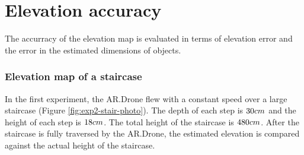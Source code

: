 \clearpage
\section{Elevation accuracy}
\label{sec:results-elevation-accuracy}
The accurracy of the elevation map is evaluated in terms of elevation error and the error in the estimated dimensions of objects.

\subsubsection{Elevation map of a staircase}

In the first experiment, the AR.Drone flew with a constant speed over a large staircase (Figure \ref{fig:exp2-stair-photo}).
The depth of each step is $30\begin{small}cm\end{small}$ and the height of each step is $18\begin{small}cm\end{small}$.
The total height of the staircase is $480\begin{small}cm\end{small}$.
After the staircase is fully traversed by the AR.Drone, the estimated elevation is compared against the actual height of the staircase.

